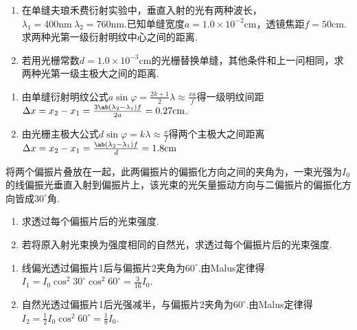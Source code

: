 \begin{problem}[弗琅禾费衍射][10]
\begin{enumerate}
    \item 在单缝夫琅禾费衍射实验中，垂直入射的光有两种波长，$\lambda_1=400\mathrm{nm}\ \lambda_2=760\mathrm{nm}$.已知单缝宽度$a=1.0\times 10^{-2}\mathrm{cm}$，透镜焦距$f=50\mathrm{cm}$.求两种光第一级衍射明纹中心之间的距离.
    \item 若用光栅常数$d=1.0\times10^{-3}\mathrm{cm}$的光栅替换单缝，其他条件和上一问相同，求两种光第一级主极大之间的距离.
\end{enumerate}
\end{problem}
\begin{solution}
    \begin{enumerate}
        \item 由单缝衍射明纹公式$a\sin{\varphi}=\frac{2k+1}{2}\lambda\approx\frac{xa}{f}$得一级明纹间距$\Delta x=x_2-x_1=\frac{3\ab(\lambda_2-\lambda_1)f}{2a}=0.27\mathrm{cm}$.
        \item 由光栅主极大公式$d\sin\varphi=k\lambda\approx\frac{x}{f}$得两个主极大之间距离
        $\Delta x=x_2-x_1=\frac{\ab(\lambda_2-\lambda_1)f}{d}=1.8\mathrm{cm}$
    \end{enumerate}
\end{solution}

\begin{problem}[光的偏振][8]
    将两个偏振片叠放在一起，此两偏振片的偏振化方向之间的夹角为，一束光强为$I_0$的线偏振光垂直入射到偏振片上，该光束的光矢量振动方向与二偏振片的偏振化方向皆成$30^{\circ}$角.
\begin{enumerate}
    \item 求透过每个偏振片后的光束强度.
    \item 若将原入射光束换为强度相同的自然光，求透过每个偏振片后的光束强度.
\end{enumerate}
\end{problem}
\begin{solution}
\begin{enumerate}
    \item 线偏光透过偏振片1后与偏振片2夹角为$60^{\circ}$.由Malus定律得$I_1=I_0\cos^2{30^{\circ}}\cos^2{60^{\circ}}=\frac{3}{16}I_0$.
    \item 自然光透过偏振片1后光强减半，与偏振片2夹角为$60^{\circ}$.由Malus定律得$I_2=\frac{1}{2}I_0\cos^2{60^{\circ}}=\frac{1}{8}I_0$.
\end{enumerate}
\end{solution}

